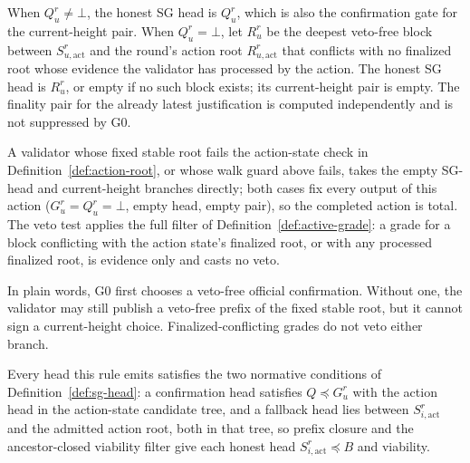 \begin{definition}
When \(Q_u^r\neq\bot\), the honest SG head is \(Q_u^r\), which is also the
confirmation gate for the current-height pair.  When \(Q_u^r=\bot\), let
\(R_u^r\) be the deepest veto-free block between
\(S_{u,\mathrm{act}}^r\) and the round's action root
\(R_{u,\mathrm{act}}^r\) that conflicts with no finalized root whose
evidence the validator has processed by the action.  The honest SG head is
\(R_u^r\), or empty if no such block exists; its current-height pair is
empty.
The finality pair for the already latest justification is computed
independently and is not suppressed by G0.

A validator whose fixed stable root fails the action-state check in
Definition~\ref{def:action-root}, or whose walk guard above fails, takes
the empty SG-head and current-height
branches directly; both cases fix every output of this action
(\(G_u^r=Q_u^r=\bot\), empty head, empty pair), so the completed action
is total.  The veto test applies the full filter of
Definition~\ref{def:active-grade}: a grade for a block conflicting with
the action state's finalized root, or with any processed finalized root,
is evidence only and casts no veto.

In plain words, G0 first chooses a veto-free official confirmation.  Without
one, the validator may still publish a veto-free prefix of the fixed stable
root, but it cannot sign a current-height choice.  Finalized-conflicting
grades do not veto either branch.
\end{definition}

\begin{remark}
\label{rem:head-checklist}
Every head this rule emits satisfies the two normative conditions of
Definition~\ref{def:sg-head}: a confirmation head satisfies
\(Q\preceq G_u^r\) with the action head in the action-state candidate
tree, and a fallback head lies between \(S_{i,\mathrm{act}}^r\) and
the admitted action root, both in that tree, so prefix closure and the
ancestor-closed viability filter give each honest head
\(S_{i,\mathrm{act}}^r\preceq B\) and viability.
\end{remark}

